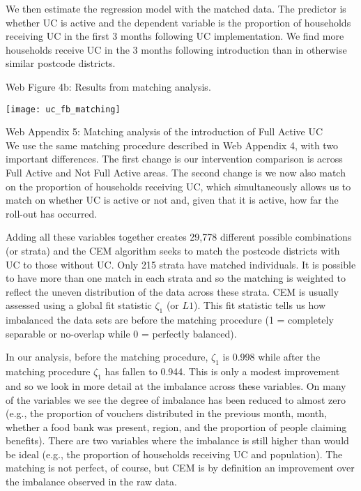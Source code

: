 \documentclass[12pt,article,oneside]{memoir}
\begin{document}
 
We then estimate the regression model with the matched data. The predictor is whether UC is active and the dependent variable is the proportion of households receiving UC in the first 3 months following UC implementation. We find more households receive UC in the 3 months following introduction than in otherwise similar postcode districts. 

Web Figure 4b: Results from matching analysis. 

\begin{center}
\texttt{[image: uc\_fb\_matching]}
\end{center}

\newpage 

Web Appendix 5: Matching analysis of the introduction of Full Active UC \\

We use the same matching procedure described in Web Appendix 4, with two important differences. The first change is our intervention comparison is across Full Active and Not Full Active areas. The second change is we now also match on the proportion of households receiving UC, which simultaneously allows us to match on whether UC is active or not and, given that it is active, how far the roll-out has occurred. 

Adding all these variables together creates 29,778 different possible combinations (or strata) and the CEM algorithm seeks to match the postcode districts with UC to those without UC. Only 215 strata have matched individuals. It is possible to have more than one match in each strata and so the matching is weighted to reflect the uneven distribution of the data across these strata. CEM is usually assessed using a global fit statistic $\zeta_1$ (or $L1$). This fit statistic tells us how imbalanced the data sets are before the matching procedure (1 = completely separable or no-overlap while 0 = perfectly balanced). 

In our analysis, before the matching procedure, $\zeta_1$ is 0.998 while after the matching procedure $\zeta_1$ has fallen to 0.944. This is only a modest improvement and so we look in more detail at the imbalance across these variables. On many of the variables we see the degree of imbalance has been reduced to almost zero (e.g., the proportion of vouchers distributed in the previous month, month, whether a food bank was present, region, and the proportion of people claiming benefits). There are two variables where the imbalance is still higher than would be ideal (e.g., the proportion of households receiving UC and population). The matching is not perfect, of course, but CEM is by definition an improvement over the imbalance observed in the raw data. 
\end{document}
